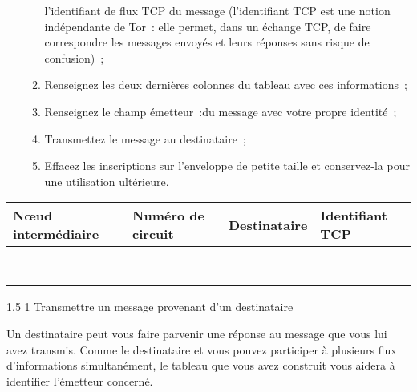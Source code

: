 \documentclass[a4paper,twoside,french]{article}
\makeatletter
\renewcommand\section{\@startsection
  {section}{1}{1cm}%
  {1.5\baselineskip}%
  {1\baselineskip}%
  {\normalfont\Large\bfseries}}%
\makeatother
\begin{document}
\begin{enumerate}
\begin{enumerate}
      l'identifiant de flux TCP du message (l'identifiant TCP est une
      notion indépendante de Tor~: elle permet, dans un échange TCP,
      de faire correspondre les messages envoyés et leurs réponses
      sans risque de confusion)~;
    \item Renseignez les deux dernières colonnes du tableau avec ces
      informations~;
    \item Renseignez le champ \og émetteur~:\fg du message avec votre
      propre identité~;
    \item Transmettez le message au destinataire~;
    \item Effacez les inscriptions sur l'enveloppe de petite taille et
      conservez-la pour une utilisation ultérieure.
    \end{enumerate}
  \end{enumerate}
  \begin{center}
    \begin{tabular}{|m{3cm}|m{3cm}|m{3cm}|m{3cm}|}
      \hline
      N\oe ud intermédiaire & Numéro de circuit &  Destinataire & Identifiant TCP \\
      \hline
      & & & \\
      & & & \\
      \hline
      & & & \\
      & & & \\
      \hline
      & & & \\
      & & & \\
      \hline
      & & & \\
      & & & \\
      \hline
    \end{tabular}
  \end{center}


  \section{Transmettre un message provenant d'un destinataire}

  Un destinataire peut vous faire parvenir une réponse au message que
  vous lui avez transmis. Comme le destinataire et vous pouvez
  participer à plusieurs flux d'informations simultanément, le tableau
  que vous avez construit vous aidera à identifier l'émetteur
  concerné.
\end{document}
